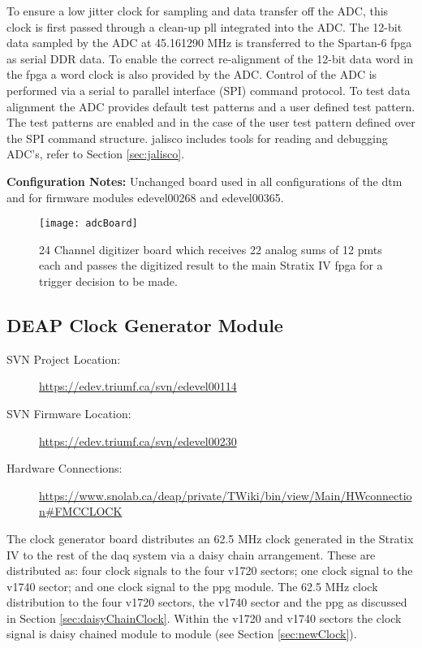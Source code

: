 To ensure a low jitter clock for sampling and data transfer off the ADC, this clock is first passed through a clean-up \gls{pll} integrated into the ADC. 
The 12-bit data sampled by the ADC at 45.161290 MHz is transferred to the Spartan-6 \gls{fpga} as serial DDR data.%
To enable the correct re-alignment of the 12-bit data word in the \gls{fpga} a word clock is also provided by the ADC. Control of the ADC is performed via a serial to parallel interface (SPI) command protocol.
To test data alignment the ADC provides default test patterns and a user defined test pattern. The test patterns are enabled and in the case of the user test pattern defined over the SPI command structure.
\gls{jalisco} includes tools for reading and debugging ADC's, refer to Section \ref{sec:jalisco}.

\textbf{Configuration Notes:} Unchanged board used in all configurations of the \gls{dtm} and for firmware modules edevel00268 and edevel00365.

\begin{figure}
\centering
\texttt{[image: adcBoard]}
\caption{24 Channel digitizer board which receives 22 analog sums of 12 \gls{pmt}s each and passes the digitized result to the main Stratix IV \gls{fpga} for a trigger decision to be made.}
\label{Fig:adcBoard}
\end{figure}


\subsection{DEAP Clock Generator Module}
\label{sec:mClockBoard}
\begin{description}
\item[SVN Project Location: ]\url{https://edev.triumf.ca/svn/edevel00114}

\item[SVN Firmware Location: ]\url{https://edev.triumf.ca/svn/edevel00230}

\item[Hardware Connections: ]\url{https://www.snolab.ca/deap/private/TWiki/bin/view/Main/HWconnection#FMCCLOCK}
\end{description}

The clock generator board distributes an 62.5 MHz clock generated in the Stratix IV to the rest of the \gls{daq} system via a daisy chain arrangement. These are distributed as: four clock signals to the four \gls{v1720} sectors; one clock signal to the \gls{v1740} sector; and one clock signal to the \gls{ppg} module. The 62.5 MHz clock distribution to the four \gls{v1720} sectors, the \gls{v1740} sector and the \gls{ppg} as discussed in Section \ref{sec:daisyChainClock}.
Within the \gls{v1720} and \gls{v1740} sectors the clock signal is daisy chained module to module (see Section \ref{sec:newClock}).

